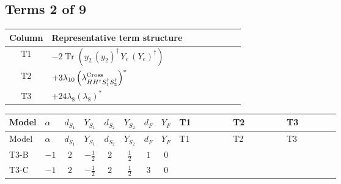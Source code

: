 \documentclass[8pt]{article}
\begin{document}
\begin{landscape}
\subsection*{Terms 2 of 9}
\begin{center}
\begin{tabular}{@{}c >{\raggedright\arraybackslash}p{0.82\linewidth}@{}}
\toprule
Column & Representative term structure \\
\midrule
T1 & \(\displaystyle -2 \operatorname{Tr}\!\left({y_2}\,\left({y_2}\right)^{\dagger}\,{Y_e}\,\left({Y_e}\right)^{\dagger}\right)\) \\
\midrule
T2 & \(\displaystyle +3 {\lambda_{10}} \left({\lambda_{H H^\dagger S_1^\dagger S_2^\dagger}^{\rm Cross}}\right)^{*}\) \\
\midrule
T3 & \(\displaystyle +24 {\lambda_{8}} \left({\lambda_{8}}\right)^{*}\) \\
\midrule
\bottomrule
\end{tabular}
\end{center}
\smallskip
\tiny
\begin{longtable}{@{}llcccccc >{\raggedright\arraybackslash}p{0.21\linewidth} >{\raggedright\arraybackslash}p{0.21\linewidth} >{\raggedright\arraybackslash}p{0.21\linewidth}@{}}
\toprule
Model & $\alpha$ & $d_{S_1}$ & $Y_{S_1}$ & $d_{S_2}$ & $Y_{S_2}$ & $d_F$ & $Y_F$ & T1 & T2 & T3 \\
\midrule
\endfirsthead
\toprule
Model & $\alpha$ & $d_{S_1}$ & $Y_{S_1}$ & $d_{S_2}$ & $Y_{S_2}$ & $d_F$ & $Y_F$ & T1 & T2 & T3 \\
\midrule
\endhead
T3-B & $-1$ & $2$ & $-\frac{1}{2}$ & $2$ & $\frac{1}{2}$ & $1$ & $0$ & \scriptsize\adjustbox{max width=\linewidth}{$\begin{gathered} -2 \operatorname{Tr}\!\left({y_2}\,\left({y_2}\right)^{\dagger}\,{Y_e}\,\left({Y_e}\right)^{\dagger}\right)\end{gathered}$} & \scriptsize\adjustbox{max width=\linewidth}{$\begin{gathered} +3 {\lambda_{10}} \left({\lambda_{H H^\dagger S_1^\dagger S_2^\dagger}^{\rm Cross}}\right)^{*}\end{gathered}$} & \scriptsize\adjustbox{max width=\linewidth}{$\begin{gathered} +24 {\lambda_{8}} \left({\lambda_{8}}\right)^{*}\end{gathered}$} \\
\midrule
T3-C & $-1$ & $2$ & $-\frac{1}{2}$ & $2$ & $\frac{1}{2}$ & $3$ & $0$ & \scriptsize\adjustbox{max width=\linewidth}{$\begin{gathered} -3 \operatorname{Tr}\!\left({y_2}\,\left({y_2}\right)^{\dagger}\,{Y_e}\,\left({Y_e}\right)^{\dagger}\right)\end{gathered}$} & \scriptsize\adjustbox{max width=\linewidth}{$\begin{gathered} +3 {\lambda_{10}} \left({\lambda_{H H^\dagger S_1^\dagger S_2^\dagger}^{\rm Cross}}\right)^{*}\end{gathered}$} & \scriptsize\adjustbox{max width=\linewidth}{$\begin{gathered} +24 {\lambda_{8}} \left({\lambda_{8}}\right)^{*}\end{gathered}$} \\

\end{longtable}
\end{landscape}
\end{document}
